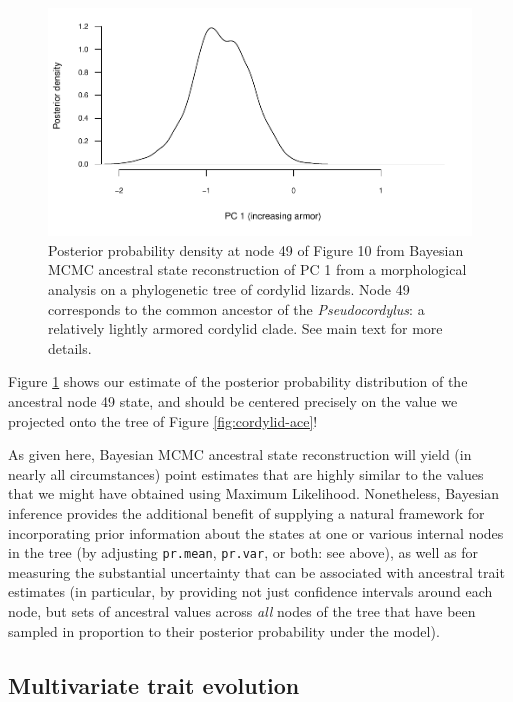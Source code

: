 \documentclass[fleqn,10pt,lineno]{wlpeerj} %
\begin{document}
\begin{figure}
\includegraphics[width=1\linewidth]{Revell.phytools-v2_peerj_files/figure-latex/cordylid-pd-1} \caption{Posterior probability density at node 49 of Figure 10 from Bayesian MCMC ancestral state reconstruction of PC 1 from a morphological analysis on a phylogenetic tree of cordylid lizards. Node 49 corresponds to the common ancestor of the \textit{Pseudocordylus}: a relatively lightly armored cordylid clade. See main text for more details.}\label{fig:cordylid-pd}
\end{figure}

Figure \ref{fig:cordylid-pd} shows our estimate of the posterior probability distribution of the ancestral node 49 state, and should be centered precisely on the value we projected onto the tree of Figure \ref{fig:cordylid-ace}!

As given here, Bayesian MCMC ancestral state reconstruction will yield (in nearly all circumstances) point estimates that are highly similar to the values that we might have obtained using Maximum Likelihood. Nonetheless, Bayesian inference provides the additional benefit of supplying a natural framework for incorporating prior information about the states at one or various internal nodes in the tree (by adjusting \texttt{pr.mean}, \texttt{pr.var}, or both: see above), as well as for measuring the substantial uncertainty that can be associated with ancestral trait estimates (in particular, by providing not just confidence intervals around each node, but sets of ancestral values across \emph{all} nodes of the tree that have been sampled in proportion to their posterior probability under the model).

\hypertarget{multivariate-trait-evolution}{%
\subsection{Multivariate trait evolution}\label{multivariate-trait-evolution}}
\end{document}
